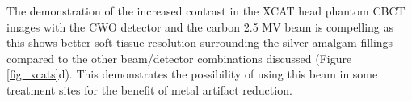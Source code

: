 The demonstration of the increased contrast in the XCAT head phantom CBCT images with the CWO detector and the carbon 2.5 MV beam is compelling as this shows better soft tissue resolution surrounding the silver amalgam fillings compared to the other beam/detector combinations discussed (Figure \ref{fig_xcats}d). This demonstrates the possibility of using this beam in some treatment sites for the benefit of metal artifact reduction.





